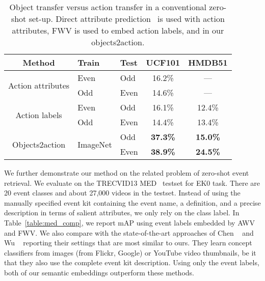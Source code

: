 \begin{table}[t]
\centering
{\small
\renewcommand{\tabcolsep}{5pt}
\begin{tabular}{| c | l | l | c | c | }
\hline
{\bf Method}             &  {\bf Train}    &  {\bf Test} &  {\bf UCF101}      &  {\bf HMDB51} \\      \hline \hline
\multirow{ 2}{*}{Action attributes}        &     Even     &       Odd       	&     16.2\%         &  ---                \\
			                   &     Odd      &     Even  	  	&     14.6\%          &   ---                \\      \hline
\multirow{ 2}{*}{Action labels}   	 &     Even            &       Odd       &     16.1\%         & 12.4\%                \\
                 	 &     Odd      &       Even      &     14.4\%         & 13.4\%                \\      \hline \hline
\multirow{ 2}{*}{Objects2action}	&  \multirow{ 2}{*}{ImageNet}  &      Odd   	&     {\bf 37.3\%}       &  {\bf 15.0\%}       \\      
                    		&					&       Even      &     {\bf 38.9\%}     &  {\bf 24.5\%}            \\      \hline
\end{tabular}}
 \caption{{Object transfer versus action transfer in a conventional zero-shot set-up. Direct attribute prediction~\cite{lampert09cvpr} is used with action attributes, FWV is used to embed action labels, and in our objects2action.}}
\label{table:obj_act_comp}
\end{table}

{
We further demonstrate our method on the related problem of zero-shot event retrieval. We evaluate on the TRECVID13 MED~\cite{over2013trecvid} testset for EK0 task. 
There are 20 event classes and about 27,000 videos in the testset.
Instead of using the manually specified event kit containing the event name, a definition, and a precise description in terms of salient attributes, we only rely on the class label. In Table~\ref{table:med_comp}, we report mAP using event labels embedded by AWV and FWV. We also compare with the state-of-the-art approaches of Chen \etal~\cite{chenICMR14eventWeakTag} and Wu \etal~\cite{wuCVPR14zeroEventMultiModal} reporting their settings that are most similar to ours. They learn concept classifiers from images (from Flickr, Google) or YouTube video thumbnails, be it that they also use the complete event kit description. Using only the event labels, both of our semantic embeddings outperform these methods.} 


